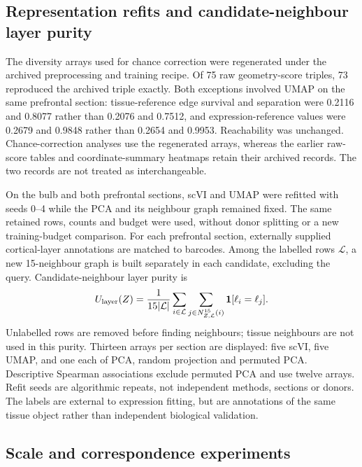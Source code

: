 \documentclass[11pt]{article}
\begin{document}
\subsection{Representation refits and candidate-neighbour layer purity}

The diversity arrays used for chance correction were regenerated under the archived preprocessing and training recipe. Of 75 raw geometry-score triples, 73 reproduced the archived triple exactly. Both exceptions involved UMAP on the same prefrontal section: tissue-reference edge survival and separation were 0.2116 and 0.8077 rather than 0.2076 and 0.7512, and expression-reference values were 0.2679 and 0.9848 rather than 0.2654 and 0.9953. Reachability was unchanged. Chance-correction analyses use the regenerated arrays, whereas the earlier raw-score tables and coordinate-summary heatmaps retain their archived records. The two records are not treated as interchangeable.

On the bulb and both prefrontal sections, scVI and UMAP were refitted with seeds 0--4 while the PCA and its neighbour graph remained fixed. The same retained rows, counts and budget were used, without donor splitting or a new training-budget comparison. For each prefrontal section, externally supplied cortical-layer annotations are matched to barcodes. Among the labelled rows $\mathcal L$, a new 15-neighbour graph is built separately in each candidate, excluding the query. Candidate-neighbour layer purity is
\begin{equation}
 U_{\rm layer}(Z)=\frac{1}{15|\mathcal L|}\sum_{i\in\mathcal L}
 \sum_{j\in N^{15}_{Z,\mathcal L}(i)}\mathbf 1[\ell_i=\ell_j].
\end{equation}
Unlabelled rows are removed before finding neighbours; tissue neighbours are not used in this purity. Thirteen arrays per section are displayed: five scVI, five UMAP, and one each of PCA, random projection and permuted PCA. Descriptive Spearman associations exclude permuted PCA and use twelve arrays. Refit seeds are algorithmic repeats, not independent methods, sections or donors. The labels are external to expression fitting, but are annotations of the same tissue object rather than independent biological validation.

\subsection{Scale and correspondence experiments}
\end{document}
